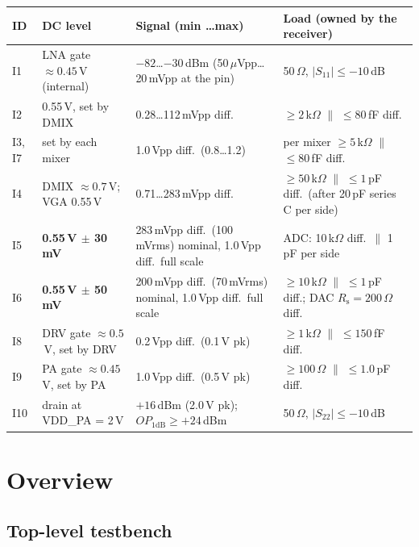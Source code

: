 \par\medskip\noindent\small
\begin{tabularx}{\textwidth}{@{}l P{0.17\textwidth} P{0.25\textwidth} L@{}}
	\toprule
	\textbf{ID} & \textbf{DC level} & \textbf{Signal (min \dots max)} & \textbf{Load (owned by the receiver)} \\
	\midrule
	I1 & LNA gate $\approx 0.45$\,V (internal) & $-82$\dots$-30$\,dBm (50\,$\mu$Vpp\dots20\,mVpp at the pin) & 50\,$\Omega$, $|S_{11}| \leq -10$\,dB \\
	I2 & 0.55\,V, set by DMIX & 0.28\dots112\,mVpp diff. & $\geq 2$\,k$\Omega$ $\parallel$ $\leq 80$\,fF diff. \\
	I3, I7 & set by each mixer & 1.0\,Vpp diff.\ (0.8\dots1.2) & per mixer $\geq 5$\,k$\Omega$ $\parallel$ $\leq 80$\,fF diff. \\
	I4 & DMIX $\approx 0.7$\,V; VGA 0.55\,V & 0.71\dots283\,mVpp diff. & $\geq 50$\,k$\Omega$ $\parallel$ $\leq 1$\,pF diff.\ (after 20\,pF series C per side) \\
	I5 & \textbf{0.55\,V $\pm$ 30\,mV} & 283\,mVpp diff.\ (100\,mVrms) nominal, 1.0\,Vpp diff.\ full scale & ADC: 10\,k$\Omega$ diff.\ $\parallel$ 1\,pF per side \\
	I6 & \textbf{0.55\,V $\pm$ 50\,mV} & 200\,mVpp diff.\ (70\,mVrms) nominal, 1.0\,Vpp diff.\ full scale & $\geq 10$\,k$\Omega$ $\parallel$ $\leq 1$\,pF diff.; DAC $R_\mathrm{s} = 200\,\Omega$ diff. \\
	I8 & DRV gate $\approx 0.5$\,V, set by DRV & 0.2\,Vpp diff.\ (0.1\,V pk) & $\geq 1$\,k$\Omega$ $\parallel$ $\leq 150$\,fF diff. \\
	I9 & PA gate $\approx 0.45$\,V, set by PA & 1.0\,Vpp diff.\ (0.5\,V pk) & $\geq 100\,\Omega$ $\parallel$ $\leq 1.0$\,pF diff. \\
	I10 & drain at VDD\_PA = 2\,V & $+16$\,dBm (2.0\,V pk); $OP_\mathrm{1dB} \geq +24$\,dBm & 50\,$\Omega$, $|S_{22}| \leq -10$\,dB \\
	\bottomrule
\end{tabularx}\par\normalsize

\section{Overview}

\subsection{Top-level testbench}


